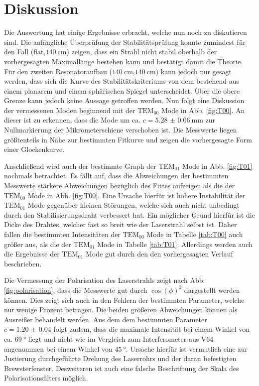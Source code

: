 
\section{Diskussion}
\label{sec:Diskussion}
Die Auswertung hat einige Ergebnisse erbracht, welche nun noch zu diskutieren sind. Die anfängliche Überprüfung der Stabilitätsprüfung konnte zumindest für den Fall (flat,$\SI{140}{\centi\meter}$) zeigen, dass ein Strahl nicht stabil oberhalb der vorhergesagten Maximallänge bestehen kann und bestätigt damit die Theorie. Für den zweiten Resonatoraufbau ($\SI{140}{\centi\meter}$,$\SI{140}{\centi\meter}$) kann jedoch nur gesagt werden, dass sich die Kurve des Stabilitätskriteriums von dem bestehend aus einem planarem und einem sphärischen Spiegel unterscheidet. Über die obere Grenze kann jedoch keine Aussage getroffen werden. %
 Nun folgt eine Diskussion der vermessenen Moden beginnend mit der $\text{TEM}_\text{00}$ Mode in Abb. \ref{fig:T00}. An dieser ist zu erkennen, dass die Mode um ca. $c = \SI{5.28(6)}{\milli\meter}$ zur Nullmarkierung der Mikrometerschiene verschoben ist. Die Messwerte liegen größtenteils in Nähe zur bestimmten Fitkurve und zeigen die vorhergesagte Form einer Glockenkurve. 
 
 Anschließend wird auch der bestimmte Graph der $\text{TEM}_\text{01}$ Mode in Abb. \ref{fig:T01} nochmals betrachtet. Es fällt auf, dass die Abweichungen der bestimmten Messwerte stärkere Abweichungen bezüglich des Fittes aufzeigen als die der $\text{TEM}_\text{00}$ Mode in Abb. \ref{fig:T00}. Eine Ursache hierfür ist höhere Instabilität der $\text{TEM}_\text{01}$ Mode gegenüber kleinen Störungen, welche sich auch nicht unbedingt durch den Stabilisierungsdraht verbessert hat. Ein möglicher Grund hierfür ist die Dicke des Drahtes, welcher fast so breit wie der Laserstrahl selbst ist. Daher fallen die bestimmten Intensitäten der $\text{TEM}_\text{00}$ Mode in Tabelle \ref{tab:T00} auch größer aus, als die der $\text{TEM}_\text{01}$ Mode in Tabelle \ref{tab:T01}.
 Allerdings werden auch die Ergebnisse der $\text{TEM}_{01}$ Mode gut durch den den vorhergesagten Verlauf beschrieben.  


Die Vermessung der Polarisation des Laserstrahls zeigt nach Abb. \ref{fig:polarisation}, dass die Messwerte gut durch $\cos(\phi)^2$ dargestellt werden können. Dies zeigt sich auch in den Fehlern der bestimmten Parameter, welche nur wenige Prozent betragen. Die beiden größeren Abweichungen können als Ausreißer behandelt werden. Aus dem dem bestimmten Parameter $c = \num{1.20(4)}$ folgt zudem, dass die maximale Intensität bei einem Winkel von ca. $\SI{69}{\degree}$ liegt und nicht wie im Vergleich zum Interferometer aus V64 angenommen bei einem Winkel von $\SI{45}{\degree}$. Ursache hierfür ist vermutlich eine zur Justierung durchgeführte Drehung des Laserrohrs und der daran befestigten Brewsterfenster. Desweiteren ist auch eine falsche Beschriftung der Skala des Polarisationsfilters möglich.


